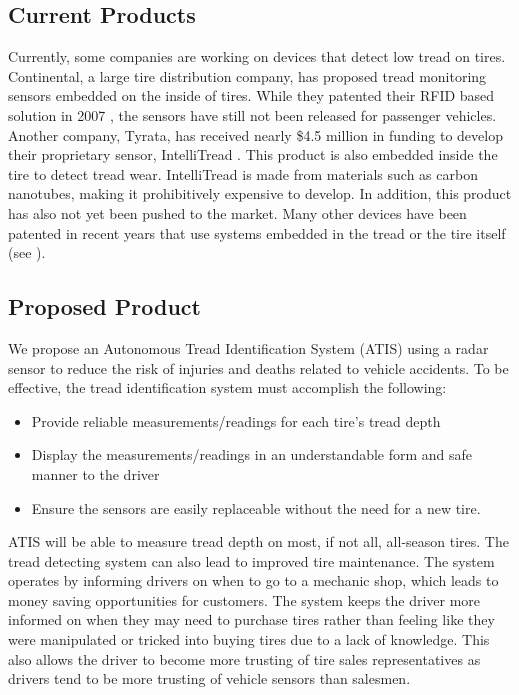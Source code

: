\documentclass[11pt]{IEEEtran}
\begin{document}
		\subsection{Current Products}
			Currently, some companies are working on devices that detect low tread on tires. Continental, a large tire distribution company, has proposed tread monitoring sensors embedded on the inside of tires. While they patented their RFID based solution in 2007 \cite{continentalPatent}, the sensors have still not been released for passenger vehicles. Another company, Tyrata, has received nearly \$4.5 million in funding to develop their proprietary sensor, IntelliTread \cite{intellitread}. This product is also embedded inside the tire to detect tread wear. IntelliTread is made from materials such as carbon nanotubes, making it prohibitively expensive to develop. In addition, this product has also not yet been pushed to the market. Many other devices have been patented in recent years that use systems embedded in the tread or the tire itself (see \cite{goodyearPatent1, nxpbvPatent, goodyearPatent2, patent4}).

		\subsection{Proposed Product}
			We propose an Autonomous Tread Identification System (ATIS) using a radar sensor to reduce the risk of injuries and deaths related to vehicle accidents. To be effective, the tread identification system must accomplish the following:

			\begin{itemize}
				\item Provide reliable measurements/readings for each tire’s tread depth
				\item Display the measurements/readings in an understandable form and safe manner to the driver
				\item Ensure the sensors are easily replaceable without the need for a new tire. 
			\end{itemize}

			ATIS will be able to measure tread depth on most, if not all, all-season tires. The tread detecting system can also lead to improved tire maintenance. The system operates by informing drivers on when to go to a mechanic shop, which leads to money saving opportunities for customers. The system keeps the driver more informed on when they may need to purchase tires rather than feeling like they were manipulated or tricked into buying tires due to a lack of knowledge. This also allows the driver to become more trusting of tire sales representatives as drivers tend to be more trusting of vehicle sensors than salesmen.
\end{document}
